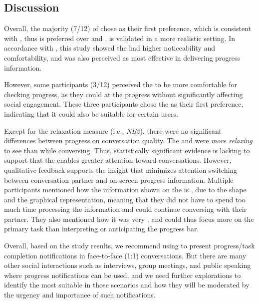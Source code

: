 \subsection{Discussion}

Overall, the majority (7/12) of  chose \circularbar{} as their first preference, which is consistent with \studyone{}, thus \circularbar{} is preferred over \linearbar{} and \textbar{}, is validated in a more realistic setting.
In accordance with \studyone{}, this study showed the \circularbar{} had higher noticeability and comfortability, and was also perceived as most effective in delivering progress information.

However, some participants (3/12) perceived the \textbar{} to be more comfortable for checking progress, as they could  at the progress without significantly affecting social engagement. These three participants chose the \textbar{} as their first preference, indicating that it could also be suitable for certain users.

Except for the relaxation measure (i.e., \textit{NB2}), there were no significant differences between progress  on conversation quality. The \circularbar{} and \linearbar{} were \textit{more relaxing} to see than \textbar{} while conversing. Thus, statistically significant evidence is lacking to support that the \circularbar{} enables greater attention toward conversations. However, qualitative feedback supports the insight that \circularbar{} minimizes attention switching between conversation partner and on-screen progress information. Multiple participants mentioned how the information shown on the \circularbar{} is , due to the shape and the graphical representation, meaning that they did not have to spend too much time processing the information and could continue conversing with their partner. They also mentioned how it was very , and could thus focus more on the primary task than interpreting or anticipating the progress bar.

Overall, based on the study results, we recommend using \circularbar{} to present progress/task completion notifications in face-to-face (1:1) conversations. But there are many other social interactions such as interviews, group meetings, and public speaking where progress notifications can be used, and we need further explorations to identify the most suitable \type{} in those scenarios and how they will be moderated by the urgency and importance of such notifications.























